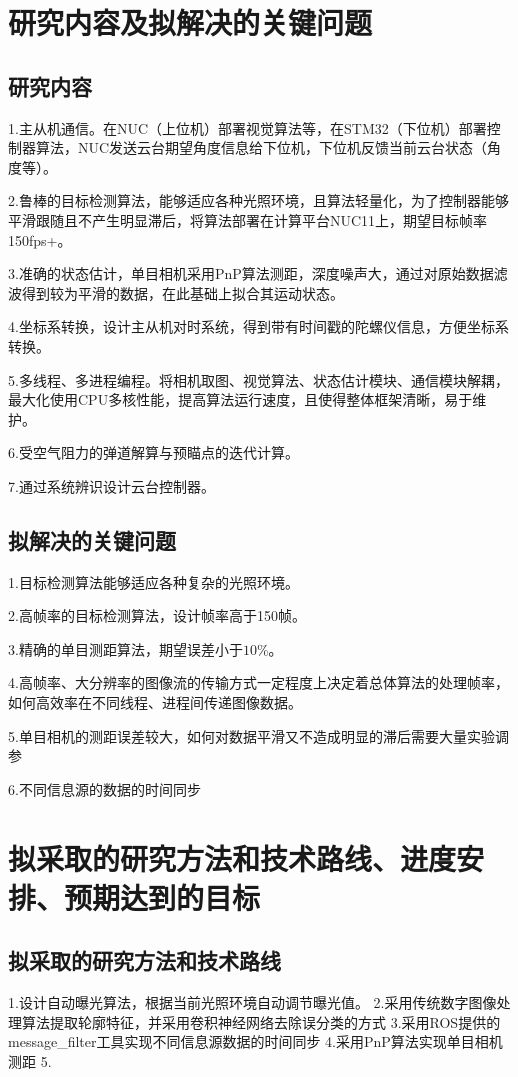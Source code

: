 \section{研究内容及拟解决的关键问题}
\subsection{研究内容}
1.主从机通信。在NUC（上位机）部署视觉算法等，在STM32（下位机）部署控制器算法，NUC发送云台期望角度信息给下位机，下位机反馈当前云台状态（角度等）。\par
2.鲁棒的目标检测算法，能够适应各种光照环境，且算法轻量化，为了控制器能够平滑跟随且不产生明显滞后，将算法部署在计算平台NUC11上，期望目标帧率150fps+。 \par
3.准确的状态估计，单目相机采用PnP算法测距，深度噪声大，通过对原始数据滤波得到较为平滑的数据，在此基础上拟合其运动状态。 \par
4.坐标系转换，设计主从机对时系统，得到带有时间戳的陀螺仪信息，方便坐标系转换。 \par
5.多线程、多进程编程。将相机取图、视觉算法、状态估计模块、通信模块解耦，最大化使用CPU多核性能，提高算法运行速度，且使得整体框架清晰，易于维护。\par
6.受空气阻力的弹道解算与预瞄点的迭代计算。\par
7.通过系统辨识设计云台控制器。\par
\subsection{拟解决的关键问题}
1.目标检测算法能够适应各种复杂的光照环境。\par
2.高帧率的目标检测算法，设计帧率高于150帧。 \par
3.精确的单目测距算法，期望误差小于$10\%$。 \par
4.高帧率、大分辨率的图像流的传输方式一定程度上决定着总体算法的处理帧率，如何高效率在不同线程、进程间传递图像数据。 \par
5.单目相机的测距误差较大，如何对数据平滑又不造成明显的滞后需要大量实验调参 \par
6.不同信息源的数据的时间同步
\section{拟采取的研究方法和技术路线、进度安排、预期达到的目标}
\subsection{拟采取的研究方法和技术路线}
1.设计自动曝光算法，根据当前光照环境自动调节曝光值。
2.采用传统数字图像处理算法提取轮廓特征，并采用卷积神经网络去除误分类的方式
3.采用ROS提供的message_filter工具实现不同信息源数据的时间同步
4.采用PnP算法实现单目相机测距
5.
